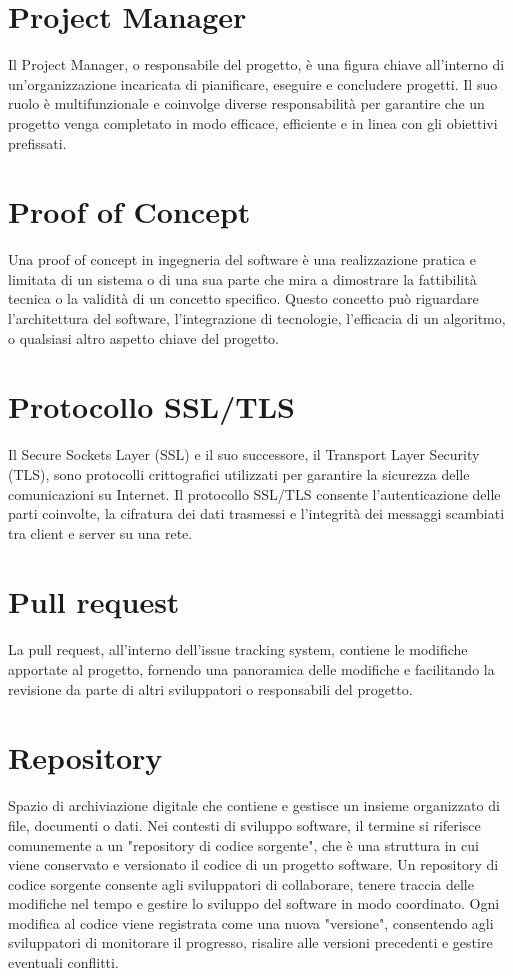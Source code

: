 \documentclass{article}
\begin{document}
\section{Project Manager}
Il Project Manager, o responsabile del progetto, è una figura chiave all'interno di un'organizzazione incaricata di pianificare, eseguire e concludere progetti. Il suo ruolo è multifunzionale e coinvolge diverse responsabilità per garantire che un progetto venga completato in modo efficace, efficiente e in linea con gli obiettivi prefissati.

\section{Proof of Concept}
Una proof of concept in ingegneria del software è una realizzazione pratica e limitata di un sistema o di una sua parte che mira a dimostrare la fattibilità tecnica o la validità di un concetto specifico. Questo concetto può riguardare l'architettura del software, l'integrazione di tecnologie, l'efficacia di un algoritmo, o qualsiasi altro aspetto chiave del progetto.

\section{Protocollo SSL/TLS}
Il Secure Sockets Layer (SSL) e il suo successore, il Transport Layer Security (TLS), sono protocolli crittografici utilizzati per garantire la sicurezza delle comunicazioni su Internet. Il protocollo SSL/TLS consente l'autenticazione delle parti coinvolte, la cifratura dei dati trasmessi e l'integrità dei messaggi scambiati tra client e server su una rete.

\section{Pull request}
La pull request, all'interno dell'issue tracking system, contiene le modifiche apportate al progetto, fornendo una panoramica delle modifiche e facilitando la revisione da parte di altri sviluppatori o responsabili del progetto.

\section{Repository}
Spazio di archiviazione digitale che contiene e gestisce un insieme organizzato di file, documenti o dati. Nei contesti di sviluppo software, il termine si riferisce comunemente a un "repository di codice sorgente", che è una struttura in cui viene conservato e versionato il codice di un progetto software. Un repository di codice sorgente consente agli sviluppatori di collaborare, tenere traccia delle modifiche nel tempo e gestire lo sviluppo del software in modo coordinato. Ogni modifica al codice viene registrata come una nuova "versione", consentendo agli sviluppatori di monitorare il progresso, risalire alle versioni precedenti e gestire eventuali conflitti.
\end{document}
